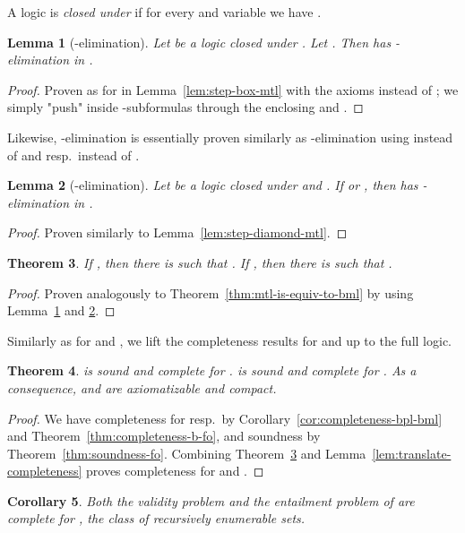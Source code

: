 \documentclass[a4paper,english,fleqn,11pt,final]{scrartcl}
\theoremstyle{plain}
\newtheorem{theorem}{Theorem}[section]
\newtheorem{lemma}[theorem]{Lemma}
\newtheorem{corollary}[theorem]{Corollary}
\theoremstyle{definition}
\begin{document}
A logic  is \emph{closed under } if for every  and variable  we have .

\begin{lemma}[-elimination]\label{lem:forall-elim}
Let  be a logic closed under . Let .
Then  has -elimination in .
\end{lemma}
\begin{proof}
Proven as for  in Lemma~\ref{lem:step-box-mtl} with the axioms  instead of ;
we simply "push"  inside -subformulas through the enclosing  and .
\end{proof}


Likewise, -elimination is essentially proven similarly as -elimination using  instead of  and  resp.\  instead of .

\begin{lemma}[-elimination]\label{lem:shriek-elim}
Let  be a logic closed under  and . If  or , then  has -elimination in .
\end{lemma}
\begin{proof}
Proven similarly to Lemma~\ref{lem:step-diamond-mtl}.
\end{proof}

\begin{theorem}\label{thm:qfo-to-bfo}
If , then there is  such that .
If , then there is  such that .
\end{theorem}
\begin{proof}
Proven analogously to Theorem~\ref{thm:mtl-is-equiv-to-bml} by using Lemma~\ref{lem:forall-elim} and \ref{lem:shriek-elim}.
\end{proof}

Similarly as for  and , we lift the completeness results for  and  up to the full logic.

\begin{theorem}\label{thm:qfo-completeness}
 is sound and complete for .
 is sound and complete for .
As a consequence,  and  are axiomatizable and compact.
\end{theorem}
\begin{proof}
We have completeness for  resp.\  by Corollary~\ref{cor:completeness-bpl-bml} and Theorem~\ref{thm:completeness-b-fo}, and soundness by Theorem~\ref{thm:soundness-fo}.
Combining Theorem~\ref{thm:qfo-to-bfo} and  Lemma~\ref{lem:translate-completeness} proves completeness for  and .
\end{proof}


\begin{corollary}
Both the validity problem and the entailment problem of  are complete for , the class of recursively enumerable sets.
\end{corollary}
\end{document}
